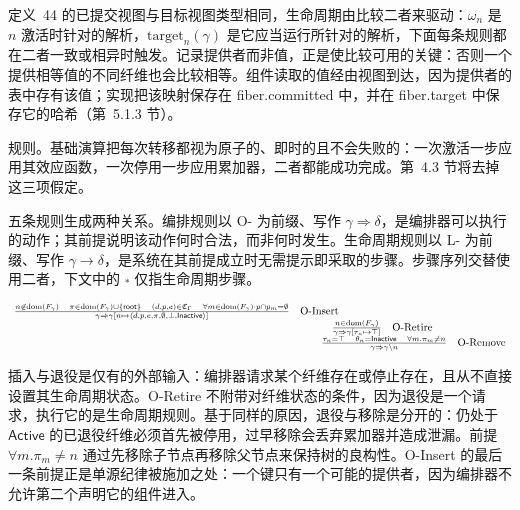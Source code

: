 定义~44 的已提交视图与目标视图类型相同，生命周期由比较二者来驱动：\(\omega _ { n }\) 是 $n$ 激活时针对的解析，\(\mathrm { t a r g e t } _ { n } ( \gamma )\) 是它应当运行所针对的解析，下面每条规则都在二者一致或相异时触发。记录提供者而非值，正是使比较可用的关键：否则一个提供相等值的不同纤维也会比较相等。组件读取的值经由视图到达，因为提供者的表中存有该值；实现把该映射保存在 fiber.committed 中，并在 fiber.target 中保存它的哈希（第~5.1.3 节）。

规则。基础演算把每次转移都视为原子的、即时的且不会失败的：一次激活一步应用其效应函数，一次停用一步应用累加器，二者都能成功完成。第~4.3 节将去掉这三项假定。

五条规则生成两种关系。编排规则以 O- 为前缀、写作 \(\gamma \Rightarrow \delta\)，是编排器可以执行的动作；其前提说明该动作何时合法，而非何时发生。生命周期规则以 L- 为前缀、写作 \(\gamma \longrightarrow \delta\)，是系统在其前提成立时无需提示即采取的步骤。步骤序列交替使用二者，下文中的 \(\stackrel { * } {  }\) 仅指生命周期步骤。

\[
\begin{array} { r l }
{ \frac { n \not \in \mathrm { d o m } \left( F _ { \gamma } \right) \quad \pi \in \mathrm { d o m } \left( F _ { \gamma } \right) \cup \{ \mathsf { r o o t } \} \quad ( d , p , e ) \in \mathfrak { C } _ { \Gamma } \quad \forall m \in \mathrm { d o m } \left( F _ { \gamma } \right) \cdot p \cap p _ { m } = \emptyset } { \gamma \Rightarrow \gamma [ n \mapsto \langle d , p , e , \pi , \emptyset , \bot , \mathsf { I n a c t i v e } \rangle ] } } & { \mathrm { O } \text {-Insert} } \\
& { \qquad \quad \frac { n \in \mathrm { d o m } \left( F _ { \gamma } \right) } { \gamma \Rightarrow \gamma [ \tau _ { n } \mapsto \top ] } \quad \mathrm { O } \text {-Retire} } \\
& { \qquad \frac { \tau _ { n } = \top \quad \theta _ { n } = \mathsf { I n a c t i v e } \quad \forall m . \pi _ { m } \neq n } { \gamma \Rightarrow \gamma \setminus n } \quad \mathrm { O } \text {-Remove} }
\end{array}
\]

插入与退役是仅有的外部输入：编排器请求某个纤维存在或停止存在，且从不直接设置其生命周期状态。O-Retire 不附带对纤维状态的条件，因为退役是一个请求，执行它的是生命周期规则。基于同样的原因，退役与移除是分开的：仍处于 $\mathsf { A c t i v e }$ 的已退役纤维必须首先被停用，过早移除会丢弃累加器并造成泄漏。前提 \(\forall m . \pi _ { m } \neq n\) 通过先移除子节点再移除父节点来保持树的良构性。O-Insert 的最后一条前提正是单源纪律被施加之处：一个键只有一个可能的提供者，因为编排器不允许第二个声明它的组件进入。

